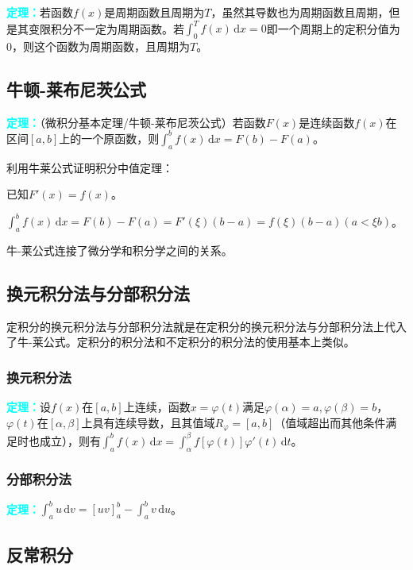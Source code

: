 \documentclass[UTF8, 12pt]{ctexart}
\begin{document}
\textcolor{aqua}{\textbf{定理：}}若函数$f(x)$是周期函数且周期为$T$，虽然其导数也为周期函数且周期，但是其变限积分不一定为周期函数。若$\int_0^Tf(x)\,\textrm{d}x=0$即一个周期上的定积分值为0，则这个函数为周期函数，且周期为$T$。



\subsection{牛顿-莱布尼茨公式}

\textcolor{aqua}{\textbf{定理：}}（微积分基本定理/牛顿-莱布尼茨公式）若函数$F(x)$是连续函数$f(x)$在区间$[a,b]$上的一个原函数，则$\int_a^bf(x)\,\textrm{d}x=F(b)-F(a)$。

利用牛莱公式证明积分中值定理：

已知$F'(x)=f(x)$。

$\int_a^bf(x)\,\textrm{d}x=F(b)-F(a)=F'(\xi)(b-a)=f(\xi)(b-a)(a<\xi b)$。

牛-莱公式连接了微分学和积分学之间的关系。

\subsection{换元积分法与分部积分法}

定积分的换元积分法与分部积分法就是在定积分的换元积分法与分部积分法上代入了牛-莱公式。定积分的积分法和不定积分的积分法的使用基本上类似。

\subsubsection{换元积分法}

\textcolor{aqua}{\textbf{定理：}}设$f(x)$在$[a,b]$上连续，函数$x=\varphi(t)$满足$\varphi(\alpha)=a,\varphi(\beta)=b$，$\varphi(t)$在$[\alpha,\beta]$上具有连续导数，且其值域$R_\varphi=[a,b]$（值域超出而其他条件满足时也成立），则有$\int_a^bf(x)\,\textrm{d}x=\int_\alpha^\beta f[\varphi(t)]\varphi'(t)\,\textrm{d}t$。

\subsubsection{分部积分法}

\textcolor{aqua}{\textbf{定理：}}$\int_a^bu\,\textrm{d}v=[uv]_a^b-\int_a^bv\,\textrm{d}u$。

\subsection{反常积分}
\end{document}
